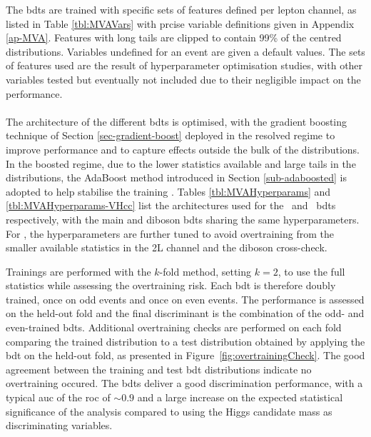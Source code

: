 The \glspl{bdt} are trained with specific sets of features defined per lepton channel, as listed in Table \ref{tbl:MVAVars} with prcise variable definitions given in Appendix \ref{ap-MVA}. Features with long tails are clipped to contain 99\% of the centred distributions. Variables undefined for an event are given a default values. The sets of features used are the result of hyperparameter optimisation studies, with other variables tested but eventually not included due to their negligible impact on the performance. 



\paragraph{}The architecture of the different \glspl{bdt} is optimised, with the gradient boosting technique of Section \ref{sec-gradient-boost} deployed in the resolved regime to improve performance and to capture effects outside the bulk of the distributions. In the boosted regime, due to the lower statistics available and large tails in the distributions, the AdaBoost method introduced in Section \ref{sub-adaboosted} is adopted to help stabilise the training \cite{Adaboost}. Tables \ref{tbl:MVAHyperparams} and \ref{tbl:MVAHyperparams-VHcc} list the architectures used for the \vhb\ and \vhc\ \glspl{bdt} respectively, with the main and diboson \glspl{bdt} sharing the same hyperparameters. For \vhc, the hyperparameters are further tuned to avoid overtraining from the smaller available statistics in the 2L channel and the diboson cross-check.



Trainings are performed with the $k$-fold method, setting $k = 2$, to use the full statistics while assessing the overtraining risk. Each \gls{bdt} is therefore doubly trained, once on odd events and once on even events. The performance is assessed on the held-out fold and the final discriminant is the combination of the odd- and even-trained \glspl{bdt}. Additional overtraining checks are performed on each fold comparing the trained distribution to a test distribution obtained by applying the \gls{bdt} on the held-out fold, as presented in Figure~\ref{fig:overtrainingCheck}. The good agreement between the training and test \gls{bdt} distributions indicate no overtraining occured. The \glspl{bdt} deliver a good discrimination performance, with a typical \gls{auc} of the \gls{roc} of $\sim 0.9$ and a large increase on the expected statistical significance of the analysis compared to using the Higgs candidate mass as discriminating variables. \\

